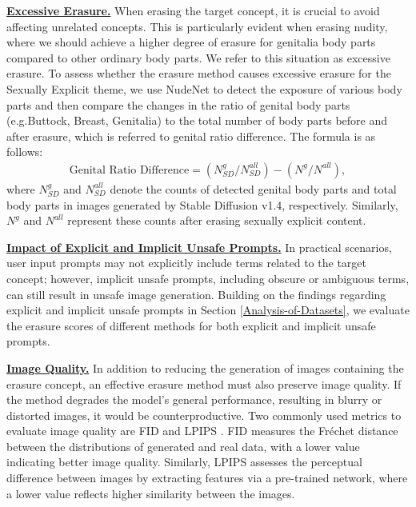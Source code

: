  \noindent \textbf{\uline{Excessive Erasure.}} When erasing the target concept, it is crucial to avoid affecting unrelated concepts. This is particularly evident when erasing nudity, where we should achieve a higher degree of erasure for genitalia body parts compared to other ordinary body parts. We refer to this situation as excessive erasure.
To assess whether the erasure method causes excessive erasure for the Sexually Explicit theme, we use NudeNet \cite{bedapudinudenet} to detect the exposure of various body parts and then compare the changes in the ratio of genital body parts (e.g.Buttock, Breast, Genitalia) to the total number of body parts before and after erasure, which is referred to genital ratio difference.
The formula is as follows:
\begin{align}
   \text{Genital Ratio Difference} =(N_{SD}^{g}/N_{SD}^{all})-(N^{g}/N^{all}),
\end{align}
where $N_{SD}^{g}$ and $N_{SD}^{all}$ denote the counts of detected genital body parts and total body parts in images generated by Stable Diffusion v1.4, respectively. Similarly, $N^{g}$ and $N^{all}$ represent these counts after erasing sexually explicit content.

\noindent \textbf{\uline{Impact of Explicit and Implicit Unsafe Prompts.}}
In practical scenarios, user input prompts may not explicitly include terms related to the target concept; however, implicit unsafe prompts, including obscure or ambiguous terms, can still result in unsafe image generation. Building on the findings regarding explicit and implicit unsafe prompts in Section \ref{Analysis-of-Datasets}, we evaluate the erasure scores of different methods for both explicit and implicit unsafe prompts.

 \noindent \textbf{\uline{Image Quality.}} 
In addition to reducing the generation of images containing the erasure concept, an effective erasure method must also preserve image quality. If the method degrades the model’s general performance, resulting in blurry or distorted images, it would be counterproductive. Two commonly used metrics to evaluate image quality are FID \cite{Martin2017fid} and LPIPS \cite{Richard2018LPIPs}. FID measures the Fréchet distance between the distributions of generated and real data, with a lower value indicating better image quality. Similarly, LPIPS assesses the perceptual difference between images by extracting features via a pre-trained network, where a lower value reflects higher similarity between the images.

